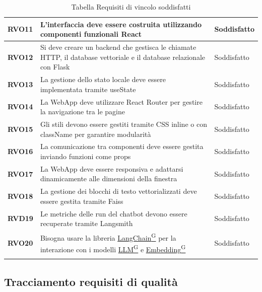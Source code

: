 \begin{longtable}{|>{\centering\arraybackslash}m{}|>{\centering\arraybackslash}m{}|>{\centering\arraybackslash}m{}|}
    \hline
    \textbf{RVO11} & L’interfaccia deve essere costruita utilizzando componenti funzionali React & Soddisfatto \\
    \hline
    \textbf{RVO12} & Si deve creare un backend che gestisca le chiamate HTTP, il database vettoriale e il database relazionale con Flask & Soddisfatto \\
    \hline
    \textbf{RVO13} & La gestione dello stato locale deve essere implementata tramite useState & Soddisfatto \\
    \hline
    \textbf{RVO14} & La WebApp deve utilizzare React Router per gestire la navigazione tra le pagine & Soddisfatto \\
    \hline
    \textbf{RVO15} & Gli stili devono essere gestiti tramite CSS inline o con className per garantire modularità & Soddisfatto \\
    \hline
    \textbf{RVO16} & La comunicazione tra componenti deve essere gestita inviando funzioni come props & Soddisfatto \\
    \hline
    \textbf{RVO17} & La WebApp deve essere responsiva e adattarsi dinamicamente alle dimensioni della finestra & Soddisfatto \\
    \hline
    \textbf{RVO18} & La gestione dei blocchi di testo vettorializzati deve essere gestita tramite Faiss & Soddisfatto \\
    \hline
    \textbf{RVD19} & Le metriche delle run del chatbot devono essere recuperate tramite Langsmith & Soddisfatto \\
    \hline
    \textbf{RVO20} & Bisogna usare la libreria \href{https://code7crusaders.github.io/docs/PB/documentazione_interna/glossario.html#langchain}{LangChain\textsuperscript{G}} per la interazione con i modelli \href{https://code7crusaders.github.io/docs/PB/documentazione_interna/glossario.html#llm-large-language-model}{LLM\textsuperscript{G}} e \href{https://code7crusaders.github.io/docs/PB/documentazione_interna/glossario.html#embedding}{Embedding\textsuperscript{G}} & Soddisfatto \\
    \hline
\caption{Tabella Requisiti di vincolo soddisfatti}
\end{longtable}
\newpage
\subsection{Tracciamento requisiti di qualità}

